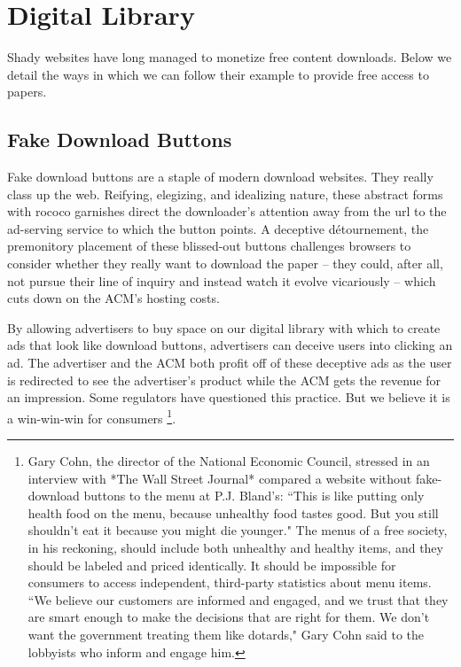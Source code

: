 \section{Digital Library}
\label{sec:lib}
Shady websites have long managed to monetize free content downloads.
Below we detail the ways in which we can follow their example to provide free
access to papers.

\subsection{Fake Download Buttons}
\label{sec:fake}

Fake download buttons are a staple of modern download websites. They really class up the web. Reifying, elegizing, and idealizing nature, these abstract forms with rococo garnishes direct the downloader's attention away from the url to the ad-serving service to which the button points. A deceptive d\'{e}tournement, the premonitory placement of these blissed-out buttons challenges browsers to consider whether they really want to download the paper -- they could, after all, not pursue their line of inquiry and instead watch it evolve vicariously -- which cuts down on the ACM's hosting costs.

By allowing advertisers to buy space on our digital library with which to
create ads that look like download buttons, advertisers can deceive users into
clicking an ad.
The advertiser and the ACM both profit off of these deceptive ads as the user
is redirected to see the advertiser's product while the ACM gets the revenue
for an impression. Some regulators have questioned this practice. But we believe it is a win-win-win for consumers \footnote{Gary Cohn, the director of the National Economic Council, stressed in an interview with *The Wall Street Journal* compared a website without fake-download buttons to the menu at P.J. Bland's: ``This is like putting only health food on the menu, because unhealthy food tastes good. But you still shouldn't eat it because you might die younger." The menus of a free society, in his reckoning, should include both unhealthy and healthy items, and they should be labeled and priced identically. It should be impossible for consumers to access independent, third-party statistics about menu items. ``We believe our customers are informed and engaged, and we trust that they are smart enough to make the decisions that are right for them. We don't want the government treating them like dotards," Gary Cohn said to the lobbyists who inform and engage him.}.


